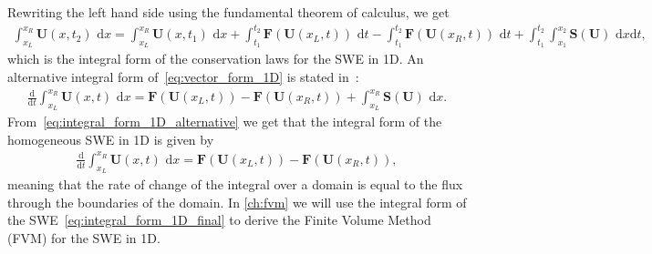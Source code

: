 Rewriting the left hand side using the fundamental theorem of calculus, we get
\begin{align}\label{eq:integral_form_1D_final}
    \int_{x_L}^{x_R} \mathbf{U}(x, t_2) \text{ d}x =
    \int_{x_L}^{x_R}  \mathbf{U}(x, t_1) \text{ d}x + \int_{t_1}^{t_2} \mathbf{F}(\mathbf{U}(x_L, t)) \text{ d}t - \int_{t_1}^{t_2} \mathbf{F}(\mathbf{U}(x_R, t)) \text{ d}t + \int_{t_1}^{t_2} \int_{x_1}^{x_2} \mathbf{S(U)} \text{ d}x \text{d}t,
\end{align}
which is the integral form of the conservation laws for the SWE in 1D.
An alternative integral form of~\eqref{eq:vector_form_1D} is stated in~\cite{Toro2024}:
\begin{align}\label{eq:integral_form_1D_alternative}
    \frac{\text{d}}{\text{d}t} \int_{x_L}^{x_R} \mathbf{U}(x,t) \text{ d}x = \mathbf{F}(\mathbf{U}(x_L, t)) - \mathbf{F}(\mathbf{U}(x_R, t)) + \int_{x_L}^{x_R} \mathbf{S}(\mathbf{U}) \text{ d}x.
\end{align}
From~\eqref{eq:integral_form_1D_alternative} we get that the integral form of the homogeneous SWE in 1D is given by
\begin{align}\label{eq:integral_form_1D_homogeneous}
    \frac{\text{d}}{\text{d}t} \int_{x_L}^{x_R} \mathbf{U}(x,t) \text{ d}x = \mathbf{F}(\mathbf{U}(x_L, t)) - \mathbf{F}(\mathbf{U}(x_R, t)),
\end{align}
meaning that the rate of change of the integral over a domain is equal to the flux through the boundaries of the domain.
In \autoref{ch:fvm} we will use the integral form of the SWE~\eqref{eq:integral_form_1D_final} to derive the Finite Volume Method (FVM) for the SWE in 1D.


